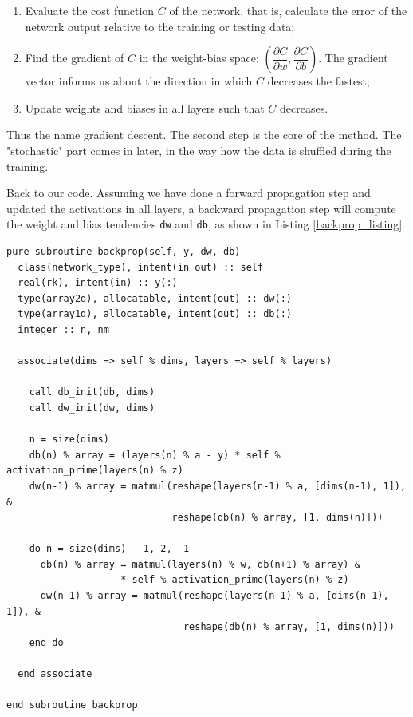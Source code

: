 \documentclass[sigplan, review=false, screen=true, balance=true]{acmart}
\begin{document}
\begin{enumerate}
  \item Evaluate the cost function $C$ of the network, that is, calculate the error
  of the network output relative to the training or testing data;
  \item Find the gradient of $C$ in the weight-bias space: $\left( \dfrac{\partial C}{\partial w}, \dfrac{\partial C}{\partial b} \right)$. The gradient vector informs us about
  the direction in which $C$ decreases the fastest;
  \item Update weights and biases in all layers such that $C$ decreases.
\end{enumerate}

Thus the name gradient descent. The second step is the core of the method.
The "stochastic" part comes in later, in the way how the data is shuffled
during the training.

Back to our code. Assuming we have done a forward propagation step and updated
the activations in all layers, a backward propagation step will compute
the weight and bias tendencies \lstinline{dw} and \lstinline{db}, as shown in
Listing \ref{backprop_listing}.

\begin{lstlisting}[caption={A subroutine to perform the backpropagation using gradient descent, and return the weight and bias tendencies.}, captionpos=b, float=*h, label={backprop_listing}]
pure subroutine backprop(self, y, dw, db)
  class(network_type), intent(in out) :: self
  real(rk), intent(in) :: y(:)
  type(array2d), allocatable, intent(out) :: dw(:)
  type(array1d), allocatable, intent(out) :: db(:)
  integer :: n, nm

  associate(dims => self % dims, layers => self % layers)

    call db_init(db, dims)
    call dw_init(dw, dims)

    n = size(dims)
    db(n) % array = (layers(n) % a - y) * self % activation_prime(layers(n) % z)
    dw(n-1) % array = matmul(reshape(layers(n-1) % a, [dims(n-1), 1]), &
                             reshape(db(n) % array, [1, dims(n)]))

    do n = size(dims) - 1, 2, -1
      db(n) % array = matmul(layers(n) % w, db(n+1) % array) &
                    * self % activation_prime(layers(n) % z)
      dw(n-1) % array = matmul(reshape(layers(n-1) % a, [dims(n-1), 1]), &
                               reshape(db(n) % array, [1, dims(n)]))
    end do

  end associate

end subroutine backprop
\end{lstlisting}
\end{document}
